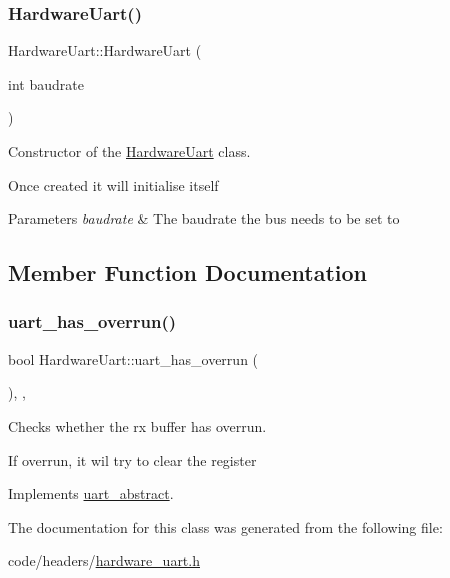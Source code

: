 \subsubsection{\texorpdfstring{Hardware\+Uart()}{HardwareUart()}}
{\footnotesize\ttfamily Hardware\+Uart\+::\+Hardware\+Uart (\begin{DoxyParamCaption}\item[{int}]{baudrate }\end{DoxyParamCaption})\hspace{0.3cm}{\ttfamily [inline]}}



Constructor of the \hyperlink{classHardwareUart}{Hardware\+Uart} class. 

Once created it will initialise itself 
\begin{DoxyParams}{Parameters}
{\em baudrate} & The baudrate the bus needs to be set to \\
\hline
\end{DoxyParams}


\subsection{Member Function Documentation}
\mbox{\label{classHardwareUart_a0cfa72622aa1bd0a2e97a56452f0c552}} 
\subsubsection{\texorpdfstring{uart\+\_\+has\+\_\+overrun()}{uart\_has\_overrun()}}
{\footnotesize\ttfamily bool Hardware\+Uart\+::uart\+\_\+has\+\_\+overrun (\begin{DoxyParamCaption}{ }\end{DoxyParamCaption})\hspace{0.3cm}{\ttfamily [inline]}, {\ttfamily [override]}, {\ttfamily [virtual]}}



Checks whether the rx buffer has overrun. 

If overrun, it wil try to clear the register 

Implements \hyperlink{classuart__abstract_a8a10405e3e52c8175899a443871c1598}{uart\+\_\+abstract}.



The documentation for this class was generated from the following file\+:\begin{DoxyCompactItemize}
\item 
code/headers/\hyperlink{hardware__uart_8h}{hardware\+\_\+uart.\+h}\end{DoxyCompactItemize}

